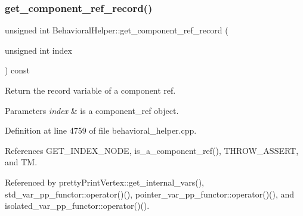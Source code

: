 \subsubsection{\texorpdfstring{get\+\_\+component\+\_\+ref\+\_\+record()}{get\_component\_ref\_record()}}
{\footnotesize\ttfamily unsigned int Behavioral\+Helper\+::get\+\_\+component\+\_\+ref\+\_\+record (\begin{DoxyParamCaption}\item[{unsigned int}]{index }\end{DoxyParamCaption}) const\hspace{0.3cm}{\ttfamily [virtual]}}



Return the record variable of a component ref. 


\begin{DoxyParams}{Parameters}
{\em index} & is a component\+\_\+ref object. \\
\hline
\end{DoxyParams}


Definition at line 4759 of file behavioral\+\_\+helper.\+cpp.



References G\+E\+T\+\_\+\+I\+N\+D\+E\+X\+\_\+\+N\+O\+DE, is\+\_\+a\+\_\+component\+\_\+ref(), T\+H\+R\+O\+W\+\_\+\+A\+S\+S\+E\+RT, and TM.



Referenced by pretty\+Print\+Vertex\+::get\+\_\+internal\+\_\+vars(), std\+\_\+var\+\_\+pp\+\_\+functor\+::operator()(), pointer\+\_\+var\+\_\+pp\+\_\+functor\+::operator()(), and isolated\+\_\+var\+\_\+pp\+\_\+functor\+::operator()().

